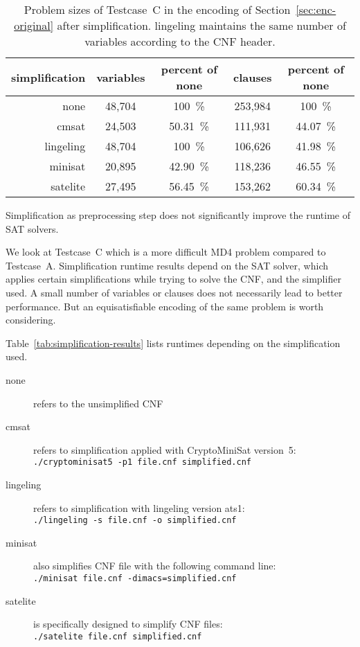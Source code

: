 \begin{table}[!h]
  \begin{center}
    \begin{tabular}{rcccc}
      \textbf{simplification} & \textbf{variables} & \textbf{percent of none} &\textbf{clauses} & \textbf{percent of none} \\
    \hline
           none &    48,704 & 100~\%   & 253,984 & 100~\% \\
          cmsat &    24,503 & 50.31~\% & 111,931 & 44.07~\% \\
      lingeling &    48,704 & 100~\%   & 106,626 & 41.98~\% \\
        minisat &    20,895 & 42.90~\% & 118,236 & 46.55~\% \\
       satelite &    27,495 & 56.45~\% & 153,262 & 60.34~\%
    \end{tabular}
    \caption{
        Problem sizes of Testcase~C in the encoding of
        Section~\ref{sec:enc-original} after simplification.
        lingeling maintains the same number of variables
        according to the CNF header.
    }
    \label{tab:simpl-size}
  \end{center}
\end{table}

\begin{prop}
  Simplification as preprocessing step does not significantly improve the runtime of SAT solvers.
\end{prop}
%
We look at Testcase~C which is a more difficult MD4 problem
compared to Testcase~A. Simplification runtime results depend on the
SAT solver, which applies certain simplifications while trying to solve the
CNF, and the simplifier used. A small number of variables or clauses does
not necessarily lead to better performance. But an equisatisfiable encoding
of the same problem is worth considering.

\newpage
Table~\ref{tab:simplification-results} lists runtimes depending
on the simplification used.

\begin{description}
\item[none]
  refers to the unsimplified CNF
\item[cmsat]
  refers to simplification applied with CryptoMiniSat version~5: \\
  \texttt{./cryptominisat5 -p1 file.cnf simplified.cnf}
\item[lingeling]
  refers to simplification with lingeling version ats1: \\
  \texttt{./lingeling -s file.cnf -o simplified.cnf}
\item[minisat]
  also simplifies CNF file with the following command line: \\
  \texttt{./minisat file.cnf -dimacs=simplified.cnf}
\item[satelite]
  is specifically designed to simplify CNF files: \\
  \texttt{./satelite file.cnf simplified.cnf}
\end{description}

